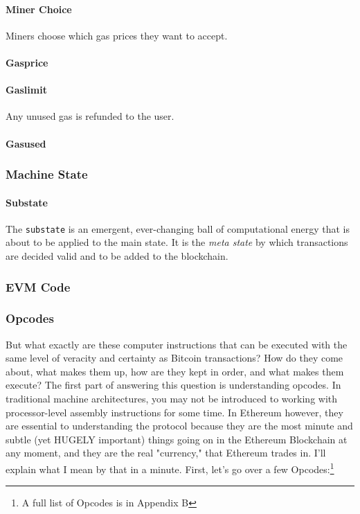 \documentclass[10pt,a4paper,leqno,bibliography=totoc]{scrartcl}
\newenvironment{alphafootnotes}
{\par\edef\savedfootnotenumber{\number\value{footnote}}
\renewcommand{\thefootnote}{\alph{footnote}}
\setcounter{footnote}{0}}
{\par\setcounter{footnote}{\savedfootnotenumber}}
\begin{document}
\begin{alphafootnotes}
\begin{multicols*}{2}
				\paragraph{Miner Choice}
					Miners choose which gas prices they want to accept.
	
				\paragraph{Gasprice}

				\paragraph{Gaslimit}
					Any unused gas is refunded to the user.

				\paragraph{Gasused}
		
			\subsubsection{Machine State}

				\paragraph{Substate}
					The \texttt{substate} is an emergent, ever-changing ball of computational energy that is about to be applied to the main state. It is the \textit{meta state} by which transactions are decided valid and to be added to the blockchain.
		
			\subsubsection{EVM Code}

			\subsubsection{Opcodes}
				But what exactly are these computer instructions that can be executed with the same level of veracity and certainty as Bitcoin transactions? How do they come about, what makes them up, how are they kept in order, and what makes them execute? The first part of answering this question is understanding opcodes. In traditional machine architectures, you may not be introduced to working with processor-level assembly instructions for some time. In Ethereum however, they are essential to understanding the protocol because they are the most minute and subtle (yet HUGELY important) things going on in the Ethereum Blockchain at any moment, and they are the real "currency," that Ethereum trades in. I'll explain what I mean by that in a minute. First, let's go over a few Opcodes:\footnote{A full list of Opcodes is in Appendix B} \\


\end{multicols*}
\end{alphafootnotes}
\end{document}
